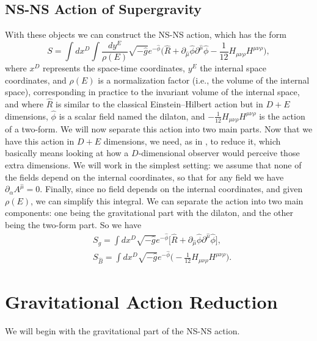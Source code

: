 \documentclass{article}
\begin{document}
\subsection{NS-NS Action of Supergravity}
With these objects we can construct the NS-NS action, which has the form
\begin{equation} \label{NS-NSaction}
    \boxed{S = \int d x^D \int \frac{d y ^E}{\rho(E)}\sqrt{- \hat g } e^{ - \hat \phi} \Big(\hat R +  \partial_{\hat \mu}\hat \phi \partial^{\hat \mu}\hat \phi - \frac{1}{12}  H_{ \mu \nu \rho}H^{ \mu\nu \rho}\Big),}
\end{equation} 
where $x^D$ represents the space-time coordinates, $y^E$ the internal space coordinates, and $\rho(E)$ is a normalization factor (i.e., the volume of the internal space), corresponding in practice to the invariant volume of the internal space,
and where $\hat R$ is similar to the classical Einstein--Hilbert action but in $D+E$ dimensions, $\hat \phi$ is a scalar field named the dilaton, and $- \frac{1}{12} H_{ \mu \nu \rho}H^{ \mu\nu \rho}$ is the action of a two-form.
We will now separate this action into two main parts.
Now that we have this action in $D+E$ dimensions, we need, as in \cite{scherk1979get}, to reduce it, which basically means looking at how a $D$-dimensional observer
would perceive those extra dimensions. We will work in the simplest setting: we assume that none of the fields depend on the internal coordinates, so that for any field we have $\partial_\alpha A^{\hat \mu} = 0$.
Finally, since no field depends on the internal coordinates, and given $\rho(E)$, we can simplify this integral.
We can separate the action into two main components: one being the gravitational part with the dilaton, and the other being the two-form part. So we have
\begin{subequations}
    \begin{align}
        &S_{\hat g} = \int d x^D\sqrt{- \hat g } e^{-\hat \phi} \big[\hat R +\partial_{\hat \mu}\hat \phi \partial^{\hat \mu}\hat \phi\big], \label{Sg}\\ 
        &S_{\hat B} =  \int d x^D \sqrt{- \hat g } e^{-\hat \phi} \Big(- \frac{1}{12} H_{ \mu \nu \rho}H^{ \mu\nu \rho}\Big). \label{SB}
    \end{align}
\end{subequations}
\clearpage
\section{Gravitational Action Reduction}
We will begin with the gravitational part of the NS-NS action.
\end{document}
